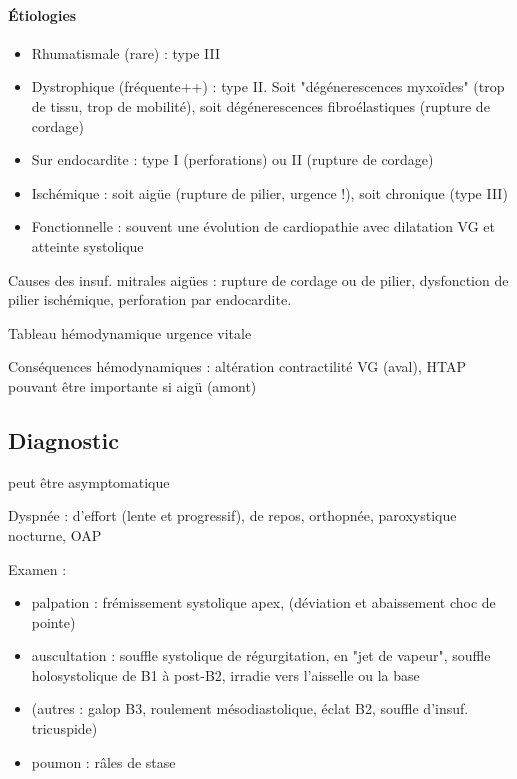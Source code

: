 \documentclass{article}
\begin{document}
\paragraph{Étiologies}
\begin{itemize}
  \item Rhumatismale (rare) : type III
  \item Dystrophique (fréquente++) : type II. Soit "dégénerescences myxoïdes"
    (trop de tissu, trop de mobilité), soit dégénerescences fibroélastiques
    (rupture de cordage)
  \item Sur endocardite : type I (perforations) ou II (rupture de cordage)
  \item Ischémique : soit aigüe (rupture de pilier, urgence \skull !), soit
    chronique (type III)
  \item Fonctionnelle : souvent une évolution de cardiopathie avec dilatation VG
    et atteinte systolique
\end{itemize}

Causes des insuf. mitrales aigües : rupture de cordage ou de pilier, dysfonction
de pilier ischémique, perforation par endocardite.

Tableau hémodynamique \thus urgence vitale \danger 

Conséquences hémodynamiques : altération contractilité VG (aval), HTAP pouvant
être importante si aigü (amont)


\subsection{Diagnostic}
\danger{} peut être asymptomatique

Dyspnée : d'effort (lente et progressif), de repos, orthopnée, paroxystique
nocturne, OAP

Examen : 
\begin{itemize}
  \item palpation : frémissement systolique apex, (déviation et abaissement choc
    de pointe)
  \item auscultation : souffle systolique de régurgitation, en "jet de vapeur",
    souffle holosystolique de B1 à post-B2, irradie vers l'aisselle ou la base
  \item (autres : galop B3, roulement mésodiastolique, éclat B2, souffle
    d'insuf. tricuspide)
  \item poumon : râles de stase
\end{itemize}
\end{document}
